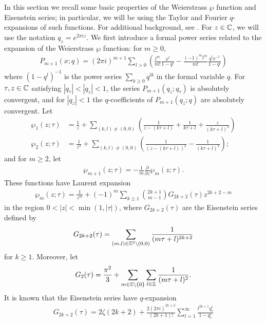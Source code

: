 \documentclass[12pt]{article}
\begin{document}
In this section we recall some basic properties of the Weierstrass $\wp$ function
and Eisenstein series; in particular, we will be using the
Taylor and Fourier $q$-expansions of such functions. For additional
background, see \cite{L,Z}.
For $z\in \mathbb{C}$, we will use the notation $q_z = e^{2\pi i z}$.
We first introduce a formal power series related to the expansion
of the Weierstrass $\wp$ function:
for $m\geq 0$,
\begin{align*}
  P_{m+1}(x;q) = (2\pi i)^{m+1}\sum_{l>0}
  \left(\frac{l^m}{m!}\frac{x^l}{1-q^l} - 
  \frac{(-1)^ml^m}{m!}\frac{q^lx^{-l}}{1-q^l}\right)
\end{align*}
where $(1-q^l)^{-1}$ is the power series $\sum_{k\geq 0} q^{lk}$ in the formal variable
$q$. For $\tau, z\in \mathbb{C}$ satisfying $|q_\tau| < |q_z| < 1$, the series
$P_{m+1}(q_z;q_\tau)$ is absolutely convergent, and for $|q_z|<1$ the
$q$-coefficients of $P_{m+1}(q_z;q)$ are absolutely convergent.
Let
\begin{align*}
  \wp_1(z;\tau) &= \frac{1}{z} + \sum_{(k,l)\neq(0,0)}
      \left(\frac{1}{z-(k\tau+l)}
      + \frac{1}{k\tau + l}
      + \frac{z}{(k\tau + l)^2}\right)\\
  \wp_2(z;\tau) &= \frac{1}{z^2} + \sum_{(k,l)\neq(0,0)}
      \left(\frac{1}{(z-(k\tau+l))^2}
      - \frac{1}{(k\tau + l)^2}\right);
\end{align*}
and for $m \geq 2$, let
\begin{align*}
  \wp_{m+1}(z;\tau) = -\frac{1}{m}\frac{\partial}{\partial z} \wp_m(z;\tau).
\end{align*}
These functions have Laurent expansion
\begin{align*}
  \wp_m(z;\tau) = \frac{1}{z^m} + (-1)^m\sum_{k\geq 1}
    \binom{2k+1}{m-1} G_{2k+2}(\tau)z^{2k+2-m}
\end{align*}
in the region $0<|z|< \min(1, |\tau|)$, where $G_{2k+2}(\tau)$ are the Eisenstein
series defined by
\begin{align*}
G_{2k+2}(\tau) = \sum_{(m,l)\in\mathbb{Z}^2\setminus (0,0)} \frac{1}{(m\tau + l)^{2k+2}}
\end{align*}
for $k\geq 1$. Moreover, let
\begin{align*}
  G_2(\tau) = \frac{\pi^2}{3} + \sum_{m\in \mathbb{Z}\setminus \{0\}}
    \sum_{l\in \mathbb{Z}} \frac{1}{(m\tau + l)^2}.
\end{align*}
It is known that the Eisenstein series have $q$-expansion
\begin{align*}
  G_{2k+2}(\tau) = 2\zeta(2k+2) + \frac{2(2\pi i)^{2k+2}}{(2k+1)!}
  \sum_{l=1}^\infty \frac{l^{2k+1}q_\tau^l}{1 - q_\tau^l}
\end{align*}
\end{document}
